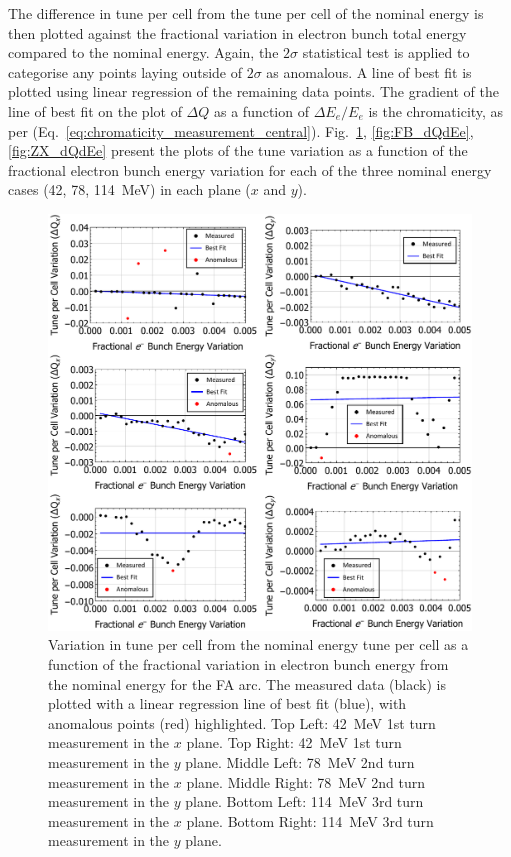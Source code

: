 \documentclass[../main.tex]{subfiles}
\begin{document}
The difference in tune per cell from the tune per cell of the nominal energy is then plotted against the fractional variation in electron bunch total energy compared to the nominal energy. Again, the $2\sigma$ statistical test is applied to categorise any points laying outside of $2\sigma$ as anomalous. A line of best fit is plotted using linear regression of the remaining data points. The gradient of the line of best fit on the plot of $\Delta Q$ as a function of $\Delta E_{e}/E_{e}$ is the chromaticity, as per (Eq.~\ref{eq:chromaticity_measurement_central}). Fig.~\ref{fig:FA_dQdEe}, \ref{fig:FB_dQdEe}, \ref{fig:ZX_dQdEe} present the plots of the tune variation as a function of the fractional electron bunch energy variation for each of the three nominal energy cases (42, 78, 114~\si{\mega\electronvolt}) in each plane ($x$ and $y$).    

\begin{figure}[!h]
\centering
\includegraphics[width=\textwidth]{Figures/CBETA_Multi-Pass_Commissioning/chromaticity/FA_analysed_3turn_dQdEe.pdf}
\caption{Variation in tune per cell from the nominal energy tune per cell as a function of the fractional variation in electron bunch energy from the nominal energy for the FA arc. The measured data (black) is plotted with a linear regression line of best fit (blue), with anomalous points (red) highlighted. Top Left: 42~\si{\mega\electronvolt} 1st turn measurement in the $x$ plane. Top Right: 42~\si{\mega\electronvolt} 1st turn measurement in the $y$ plane. Middle Left: 78~\si{\mega\electronvolt} 2nd turn measurement in the $x$ plane. Middle Right: 78~\si{\mega\electronvolt} 2nd turn measurement in the $y$ plane. Bottom Left: 114~\si{\mega\electronvolt} 3rd turn measurement in the $x$ plane. Bottom Right: 114~\si{\mega\electronvolt} 3rd turn measurement in the $y$ plane.}
\label{fig:FA_dQdEe}
\end{figure}
\end{document}
